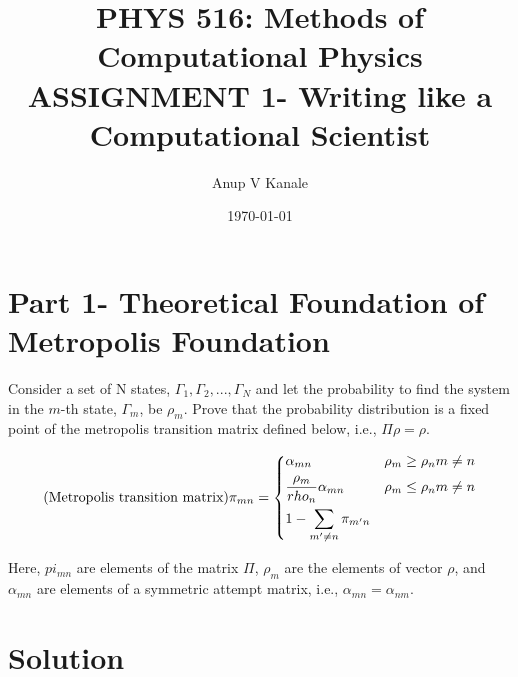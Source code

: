 \documentclass[11pt, oneside]{article}   	%
\title{\large PHYS 516: Methods of Computational Physics \\
  \normalsize ASSIGNMENT 1- Writing like a Computational Scientist}
\author{Anup V Kanale}
\date{\today}							%
\begin{document}
\maketitle
\section{Part 1- Theoretical Foundation of Metropolis Foundation}
Consider a set of N states, {$\Gamma_1, \Gamma_2, ..., \Gamma_N$} and let the probability to find the system in the $m$-th state, $\Gamma_m$, be $\rho_m$. Prove that the probability distribution is a fixed point of the metropolis transition matrix defined below, i.e., $\Pi \rho = \rho$.

\[
\text{(Metropolis transition matrix)} \pi_{mn}= 
\begin{dcases}
	\alpha_{mn} & \rho_m \geq \rho_n m \neq n \\
    \frac{\rho_m}{rho_n} \alpha_{mn} & \rho_m \leq \rho_n m \neq n \\
    1- \sum\limits_{m' \neq n} \pi_{m'n}
\end{dcases}
\]

Here, $pi_{mn}$ are elements of the matrix $\Pi$, $\rho_m$ are the elements of vector $\rho$, and $\alpha_{mn}$ are elements of a symmetric attempt matrix, i.e., $\alpha_{mn}= \alpha_{nm}$.
\section{Solution}
\end{document}
